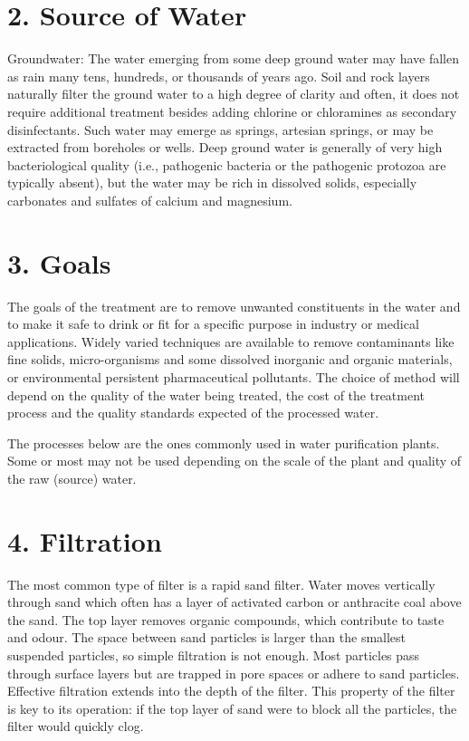 \documentclass[12pt]{article}
\begin{document}
 \section*{2.  Source of Water}
 Groundwater: The water emerging from some deep ground water may have fallen as rain many tens, hundreds, or thousands of years ago. Soil and rock layers naturally filter the ground water to a high degree of clarity and often, it does not require additional treatment besides adding chlorine or chloramines as secondary disinfectants. Such water may emerge as springs, artesian springs, or may be extracted from boreholes or wells. Deep ground water is generally of very high bacteriological quality (i.e., pathogenic bacteria or the pathogenic protozoa are typically absent), but the water may be rich in dissolved solids, especially carbonates and sulfates of calcium and magnesium.
 
\section*{3.  Goals}
The goals of the treatment are to remove unwanted constituents in the water and to make it safe to drink or fit for a specific purpose in industry or medical applications. Widely varied techniques are available to remove contaminants like fine solids, micro-organisms and some dissolved inorganic and organic materials, or environmental persistent pharmaceutical pollutants. The choice of method will depend on the quality of the water being treated, the cost of the treatment process and the quality standards expected of the processed water.

The processes below are the ones commonly used in water purification plants. Some or most may not be used depending on the scale of the plant and quality of the raw (source) water.

\section*{4.  Filtration}
The most common type of filter is a rapid sand filter. Water moves vertically through sand which often has a layer of activated carbon or anthracite coal above the sand. The top layer removes organic compounds, which contribute to taste and odour. The space between sand particles is larger than the smallest suspended particles, so simple filtration is not enough. Most particles pass through surface layers but are trapped in pore spaces or adhere to sand particles. Effective filtration extends into the depth of the filter. This property of the filter is key to its operation: if the top layer of sand were to block all the particles, the filter would quickly clog.
\end{document}
